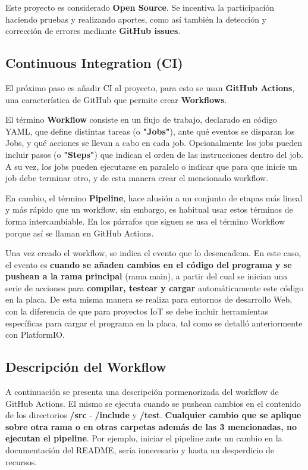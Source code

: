 Este proyecto es considerado \textbf{Open Source}. Se incentiva la participación haciendo pruebas y realizando aportes, como así también la detección y corrección de errores mediante \textbf{GitHub issues}. 

\subsection{Continuous Integration (CI)}
El próximo paso es añadir CI al proyecto, para esto se usan \textbf{GitHub Actions}, una característica de GitHub que permite crear \textbf{Workflows}.

El término \textbf{Workflow} consiste en un flujo de trabajo, declarado en código YAML, que define distintas tareas (o \textbf{"Jobs"}), ante qué eventos se disparan los Jobs, y qué acciones se llevan a cabo en cada job. Opcionalmente los jobs pueden incluir pasos (o \textbf{"Steps"}) que indican el orden de las instrucciones dentro del job. A su vez, los jobs pueden ejecutarse en paralelo o indicar que para que inicie un job debe terminar otro, y de esta manera crear el mencionado workflow.

En cambio, el término \textbf{Pipeline}, hace alusión a un conjunto de etapas más lineal y más rápido que un workflow, sin embargo, es habitual usar estos términos de forma intercambiable. En los párrafos que siguen se usa el término Workflow porque así se llaman en GitHub Actions.

Una vez creado el workflow, se indica el evento que lo desencadena. En este caso, el evento es \textbf{cuando se añaden cambios en el código del programa y se pushean a la rama principal} (rama main), a partir del cual se inician una serie de acciones para \textbf{compilar, testear y cargar} automáticamente este código en la placa. De esta misma manera se realiza para entornos de desarrollo Web, con la diferencia de que para proyectos IoT se debe incluir herramientas específicas para cargar el programa en la placa, tal como se detalló anteriormente con PlatformIO.

\subsection{Descripción del Workflow}
A continuación se presenta una descripción pormenorizada del workflow de GitHub Actions. El mismo se ejecuta cuando se pushean cambios en el contenido de los directorios \textbf{/src} - \textbf{/include} y \textbf{/test}. \textbf{Cualquier cambio que se aplique sobre otra rama o en otras carpetas además de las 3 mencionadas, no ejecutan el pipeline}. Por ejemplo, iniciar el pipeline ante un cambio en la documentación del README, sería innecesario y hasta un desperdicio de recursos. 

